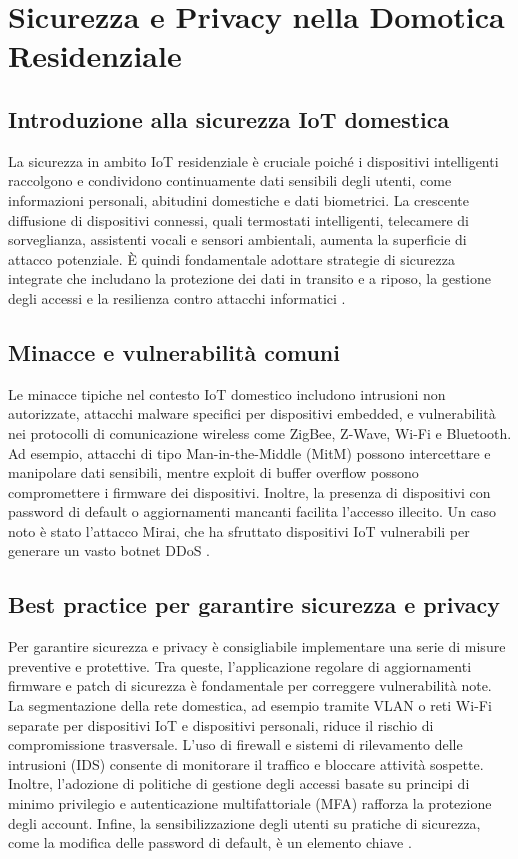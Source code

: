 
\chapter{Sicurezza e Privacy nella Domotica Residenziale}

\section{Introduzione alla sicurezza IoT domestica}
La sicurezza in ambito IoT residenziale è cruciale poiché i dispositivi intelligenti raccolgono e condividono continuamente dati sensibili degli utenti, come informazioni personali, abitudini domestiche e dati biometrici. La crescente diffusione di dispositivi connessi, quali termostati intelligenti, telecamere di sorveglianza, assistenti vocali e sensori ambientali, aumenta la superficie di attacco potenziale. È quindi fondamentale adottare strategie di sicurezza integrate che includano la protezione dei dati in transito e a riposo, la gestione degli accessi e la resilienza contro attacchi informatici \parencite{roman2013, sicari2015}.

\section{Minacce e vulnerabilità comuni}
Le minacce tipiche nel contesto IoT domestico includono intrusioni non autorizzate, attacchi malware specifici per dispositivi embedded, e vulnerabilità nei protocolli di comunicazione wireless come ZigBee, Z-Wave, Wi-Fi e Bluetooth. Ad esempio, attacchi di tipo Man-in-the-Middle (MitM) possono intercettare e manipolare dati sensibili, mentre exploit di buffer overflow possono compromettere i firmware dei dispositivi. Inoltre, la presenza di dispositivi con password di default o aggiornamenti mancanti facilita l'accesso illecito. Un caso noto è stato l'attacco Mirai, che ha sfruttato dispositivi IoT vulnerabili per generare un vasto botnet DDoS \parencite{miraiBotnet}.

\section{Best practice per garantire sicurezza e privacy}
Per garantire sicurezza e privacy è consigliabile implementare una serie di misure preventive e protettive. Tra queste, l'applicazione regolare di aggiornamenti firmware e patch di sicurezza è fondamentale per correggere vulnerabilità note. La segmentazione della rete domestica, ad esempio tramite VLAN o reti Wi-Fi separate per dispositivi IoT e dispositivi personali, riduce il rischio di compromissione trasversale. L'uso di firewall e sistemi di rilevamento delle intrusioni (IDS) consente di monitorare il traffico e bloccare attività sospette. Inoltre, l'adozione di politiche di gestione degli accessi basate su principi di minimo privilegio e autenticazione multifattoriale (MFA) rafforza la protezione degli account. Infine, la sensibilizzazione degli utenti su pratiche di sicurezza, come la modifica delle password di default, è un elemento chiave \parencite{sicari2015, yang2017}.

